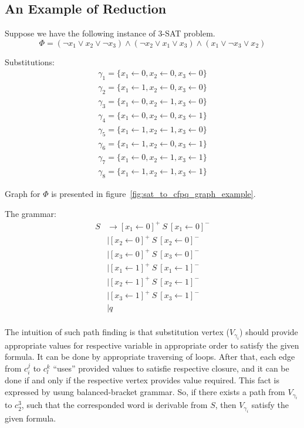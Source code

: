 \subsection{An Example of Reduction}

Suppose we have the following instance of 3-SAT problem. 
$$
\Phi = (\neg x_1 \vee x_2 \vee \neg x_3) \wedge (\neg x_2 \vee x_1 \vee x_3) \wedge (x_1 \vee \neg x_3 \vee x_2)
$$

Substitutions:
\begin{align*}
\gamma_1 = \{x_1 \leftarrow 0, x_2 \leftarrow 0, x_3 \leftarrow 0\} \\
\gamma_2 = \{x_1 \leftarrow 1, x_2 \leftarrow 0, x_3 \leftarrow 0\} \\
\gamma_3 = \{x_1 \leftarrow 0, x_2 \leftarrow 1, x_3 \leftarrow 0\} \\
\gamma_4 = \{x_1 \leftarrow 0, x_2 \leftarrow 0, x_3 \leftarrow 1\} \\
\gamma_5 = \{x_1 \leftarrow 1, x_2 \leftarrow 1, x_3 \leftarrow 0\} \\
\gamma_6 = \{x_1 \leftarrow 1, x_2 \leftarrow 0, x_3 \leftarrow 1\} \\
\gamma_7 = \{x_1 \leftarrow 0, x_2 \leftarrow 1, x_3 \leftarrow 1\} \\
\gamma_8 = \{x_1 \leftarrow 1, x_2 \leftarrow 1, x_3 \leftarrow 1\} 
\end{align*}

Graph for $\Phi$ is presented in figure~\ref{fig:sat_to_cfpq_graph_example}.

The grammar:
\begin{align*}
S & \to  [x_1 \leftarrow 0]^+ \ S \ [x_1 \leftarrow 0]^- \\
  & \mid [x_2 \leftarrow 0]^+ \ S \ [x_2 \leftarrow 0]^- \\ 
  & \mid [x_3 \leftarrow 0]^+ \ S \ [x_3 \leftarrow 0]^- \\
  & \mid [x_1 \leftarrow 1]^+ \ S \ [x_1 \leftarrow 1]^- \\ 
  & \mid [x_2 \leftarrow 1]^+ \ S \ [x_2 \leftarrow 1]^- \\ 
  & \mid [x_3 \leftarrow 1]^+ \ S \ [x_3 \leftarrow 1]^- \\
  & \mid q \\
\end{align*}

The intuition of such path finding is that substitution vertex ($V_{\gamma_i}$) should provide appropriate values for respective variable in appropriate order to satisfy the given formula.
It can be done by appropriate traversing of loops. 
After that, each edge from $c_i^j$ to  $c_l^k$ ``uses'' provided values to satisfie respective closure, and it can be done if and only if the respective vertex provides value required.
This fact is expressed by usung balanced-bracket grammar.
So, if there exists a path from $V_{\gamma_i}$ to $c_2^3$, such that the corresponded word is derivable from $S$, then $V_{\gamma_i}$ satisfy the given formula. 


